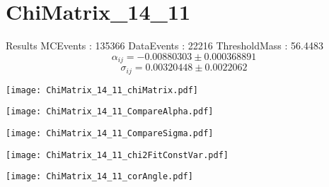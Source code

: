 \documentclass[a4paper,12pt]{article}
\begin{document}
\section{ChiMatrix\_14\_11}
\begin{minipage}{0.49\linewidth} Results \newline
MCEvents : 135366\newline
DataEvents : 22216 \newline
ThresholdMass : 56.4483\\
$$\alpha_{ij} = -0.00880303\pm 0.000368891$$
$$\sigma_{ij} = 0.00320448\pm 0.0022062$$
\end{minipage}\hfill
\begin{minipage}{0.49\linewidth} 
\texttt{[image: ChiMatrix\_14\_11\_chiMatrix.pdf]}\\
\end{minipage}
\hfill
\begin{minipage}{0.49\linewidth} 
\texttt{[image: ChiMatrix\_14\_11\_CompareAlpha.pdf]}\\
\end{minipage}
\hfill
\begin{minipage}{0.49\linewidth} 
\texttt{[image: ChiMatrix\_14\_11\_CompareSigma.pdf]}\\
\end{minipage}
\begin{minipage}{0.49\linewidth} 
\texttt{[image: ChiMatrix\_14\_11\_chi2FitConstVar.pdf]}\\
\end{minipage}
\hfill
\begin{minipage}{0.49\linewidth} 
\texttt{[image: ChiMatrix\_14\_11\_corAngle.pdf]}\\
\end{minipage}
\end{document}
